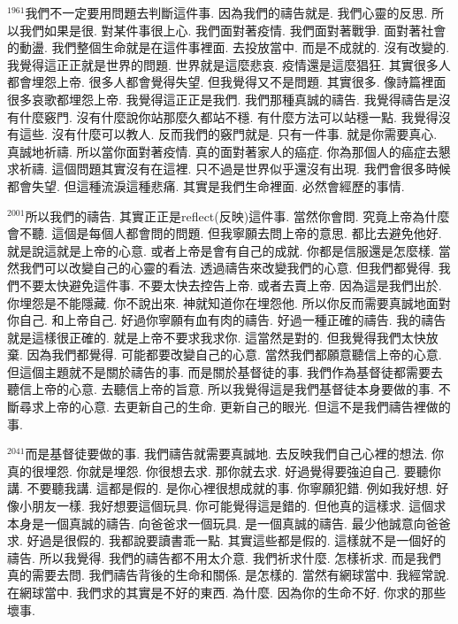 \documentclass{book}
\begin{document}
$^{1961}$我們不一定要用問題去判斷這件事.
因為我們的禱告就是.
我們心靈的反思.
所以我們如果是很.
對某件事很上心.
我們面對著疫情.
我們面對著戰爭.
面對著社會的動盪.
我們整個生命就是在這件事裡面.
去投放當中.
而是不成就的.
沒有改變的.
我覺得這正正就是世界的問題.
世界就是這麼悲哀.
疫情還是這麼猖狂.
其實很多人都會埋怨上帝.
很多人都會覺得失望.
但我覺得又不是問題.
其實很多.
像詩篇裡面很多哀歌都埋怨上帝.
我覺得這正正是我們.
我們那種真誠的禱告.
我覺得禱告是沒有什麼竅門.
沒有什麼說你站那麼久都站不穩.
有什麼方法可以站穩一點.
我覺得沒有這些.
沒有什麼可以教人.
反而我們的竅門就是.
只有一件事.
就是你需要真心.
真誠地祈禱.
所以當你面對著疫情.
真的面對著家人的癌症.
你為那個人的癌症去懇求祈禱.
這個問題其實沒有在這裡.
只不過是世界似乎還沒有出現.
我們會很多時候都會失望.
但這種流淚這種悲痛.
其實是我們生命裡面.
必然會經歷的事情.

$^{2001}$所以我們的禱告.
其實正正是reflect(反映)這件事.
當然你會問.
究竟上帝為什麼會不聽.
這個是每個人都會問的問題.
但我寧願去問上帝的意思.
都比去避免他好.
就是說這就是上帝的心意.
或者上帝是會有自己的成就.
你都是信服還是怎麼樣.
當然我們可以改變自己的心靈的看法.
透過禱告來改變我們的心意.
但我們都覺得.
我們不要太快避免這件事.
不要太快去控告上帝.
或者去賣上帝.
因為這是我們出於.
你埋怨是不能隱藏.
你不說出來.
神就知道你在埋怨他.
所以你反而需要真誠地面對你自己.
和上帝自己.
好過你寧願有血有肉的禱告.
好過一種正確的禱告.
我的禱告就是這樣很正確的.
就是上帝不要求我求你.
這當然是對的.
但我覺得我們太快放棄.
因為我們都覺得.
可能都要改變自己的心意.
當然我們都願意聽信上帝的心意.
但這個主題就不是關於禱告的事.
而是關於基督徒的事.
我們作為基督徒都需要去聽信上帝的心意.
去聽信上帝的旨意.
所以我覺得這是我們基督徒本身要做的事.
不斷尋求上帝的心意.
去更新自己的生命.
更新自己的眼光.
但這不是我們禱告裡做的事.

$^{2041}$而是基督徒要做的事.
我們禱告就需要真誠地.
去反映我們自己心裡的想法.
你真的很埋怨.
你就是埋怨.
你很想去求.
那你就去求.
好過覺得要強迫自己.
要聽你講.
不要聽我講.
這都是假的.
是你心裡很想成就的事.
你寧願犯錯.
例如我好想.
好像小朋友一樣.
我好想要這個玩具.
你可能覺得這是錯的.
但他真的這樣求.
這個求本身是一個真誠的禱告.
向爸爸求一個玩具.
是一個真誠的禱告.
最少他誠意向爸爸求.
好過是很假的.
我都說要讀書乖一點.
其實這些都是假的.
這樣就不是一個好的禱告.
所以我覺得.
我們的禱告都不用太介意.
我們祈求什麼.
怎樣祈求.
而是我們真的需要去問.
我們禱告背後的生命和關係.
是怎樣的.
當然有網球當中.
我經常說.
在網球當中.
我們求的其實是不好的東西.
為什麼.
因為你的生命不好.
你求的那些壞事.
\end{document}

